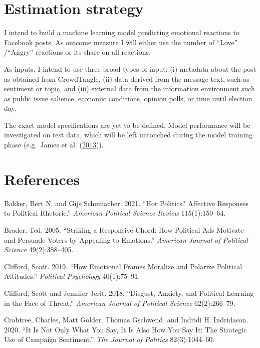 \documentclass[
  12pt,
]{article}
\begin{document}
\hypertarget{estimation-strategy}{%
\section{Estimation strategy}\label{estimation-strategy}}

I intend to build a machine learning model predicting emotional reactions to Facebook posts. As outcome measure I will either use the number of ``Love'' /``Angry'' reactions or its share on all reactions.

As inputs, I intend to use three broad types of input: (i) metadata about the post as obtained from CrowdTangle, (ii) data derived from the message text, such as sentiment or topic, and (iii) external data from the information environment such as public issue salience, economic conditions, opinion polls, or time until election day.

The exact model specifications are yet to be defined. Model performance will be investigated on test data, which will be left untouched during the model training phase (e.g.~James et al. (\protect\hyperlink{ref-james2013introduction}{2013})).

\hypertarget{references}{%
\section{References}\label{references}}

\linespread{1}

\hypertarget{refs}{}
\leavevmode\hypertarget{ref-bakker2021hot}{}%
Bakker, Bert N. and Gijs Schumacher. 2021. ``Hot Politics? Affective Responses to Political Rhetoric.'' \emph{American Political Science Review} 115(1):150--64.

\leavevmode\hypertarget{ref-brader2005striking}{}%
Brader, Ted. 2005. ``Striking a Responsive Chord: How Political Ads Motivate and Persuade Voters by Appealing to Emotions.'' \emph{American Journal of Political Science} 49(2):388--405.

\leavevmode\hypertarget{ref-clifford2019how}{}%
Clifford, Scott. 2019. ``How Emotional Frames Moralize and Polarize Political Attitudes.'' \emph{Political Psychology} 40(1):75--91.

\leavevmode\hypertarget{ref-clifford2018disgust}{}%
Clifford, Scott and Jennifer Jerit. 2018. ``Disgust, Anxiety, and Political Learning in the Face of Threat.'' \emph{American Journal of Political Science} 62(2):266--79.

\leavevmode\hypertarget{ref-crabtree2020how}{}%
Crabtree, Charles, Matt Golder, Thomas Gschwend, and Indridi H. Indridason. 2020. ``It Is Not Only What You Say, It Is Also How You Say It: The Strategic Use of Campaign Sentiment.'' \emph{The Journal of Politics} 82(3):1044--60.
\end{document}
